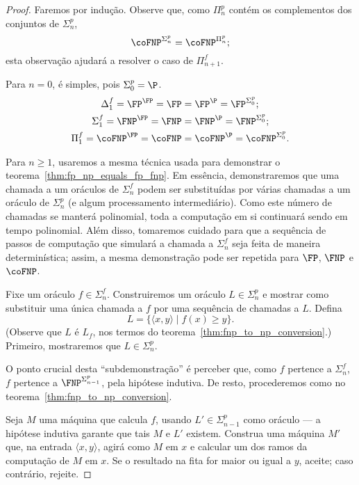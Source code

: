 \begin{proof}
    Faremos por indução.
    Observe que,
    como $\Pi_n^p$ contém os complementos dos conjuntos de $\Sigma_n^p$,
    \begin{equation*}
        \coFNP^{\Sigma_n^p} = \coFNP^{\Pi_n^p};
    \end{equation*}
    esta observação ajudará a resolver o caso de $\Pi_{n+1}^f$.

    Para $n = 0$, é simples, pois $\Sigma_0^p = \P$.
    \begin{align*}
        \Delta_1^f = \FP^\FP = \FP &= \FP^\P = \FP^{\Sigma_0^p}; \\
        \Sigma_1^f = \FNP^\FP = \FNP &= \FNP^\P = \FNP^{\Sigma_0^p}; \\
        \Pi_1^f = \coFNP^\FP = \coFNP &= \coFNP^\P = \coFNP^{\Sigma_0^p}.
    \end{align*}

    Para $n \geq 1$, usaremos a mesma técnica usada
    para demonstrar o teorema~\ref{thm:fp_np_equals_fp_fnp}.
    Em essência,
    demonstraremos que uma chamada a um oráculos de $\Sigma_n^f$
    podem ser substituídas por várias chamadas a um oráculo de $\Sigma_n^p$
    (e algum processamento intermediário).
    Como este número de chamadas se manterá polinomial,
    toda a computação em si continuará sendo em tempo polinomial.
    Além disso,
    tomaremos cuidado para que a sequência de passos de computação
    que simulará a chamada a $\Sigma_n^f$
    seja feita de maneira determinística;
    assim,
    a mesma demonstração pode ser repetida para $\FP$, $\FNP$ e $\coFNP$.

    Fixe um oráculo $f \in \Sigma_n^f$.
    Construiremos um oráculo $L \in \Sigma_n^p$
    e mostrar como substituir uma única chamada a $f$
    por uma sequência de chamadas a $L$.
    Defina
    \begin{equation*}
        L = \{\langle x, y\rangle \mid f(x) \geq y\}.
    \end{equation*}
    (Observe que $L$ é $L_f$, nos termos do teorema~\ref{thm:fnp_to_np_conversion}.)
    Primeiro, mostraremos que $L \in \Sigma_n^p$.

    O ponto crucial desta ``subdemonstração'' é perceber que,
    como $f$ pertence a $\Sigma_n^f$,
    $f$ pertence a $\FNP^{\Sigma_{n-1}^p}$,
    pela hipótese indutiva.
    De resto, procederemos como no teorema~\ref{thm:fnp_to_np_conversion}.

    Seja $M$ uma máquina que calcula $f$,
    usando $L' \in \Sigma_{n-1}^p$ como oráculo
    --- a hipótese indutiva garante que tais $M$ e $L'$ existem.
    Construa uma máquina $M'$ que,
    na entrada $\langle x, y \rangle$,
    agirá como $M$ em $x$ e calcular um dos ramos da computação de $M$ em $x$.
    Se o resultado na fita for maior ou igual a $y$,
    aceite;
    caso contrário, rejeite.


\end{proof}
